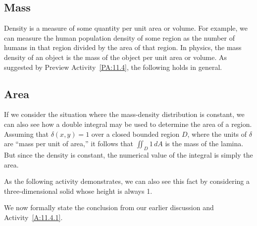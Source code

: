 

\subsection*{Mass}

Density is a measure of some quantity per unit area or volume. For example, we can measure the human population density of some region as the number of humans in that region divided by the area of that region. In physics, the mass density of an object is the mass of the object per unit area or volume.  As suggested by Preview Activity~\ref{PA:11.4}, the following holds in general.

 \vspace*{5pt}
\nin {}
\vspace*{5pt}



\subsection*{Area}

If we consider the situation where the mass-density distribution is constant, we can also see how a double integral may be used to determine the area of a region.  Assuming that $\delta(x,y) = 1$ over a closed bounded region $D$, where the units of $\delta$ are ``mass per unit of area,'' it follows that $\iint_D 1 \, dA$ is the mass of the lamina.  But since the density is constant, the numerical value of the integral is simply the area. 

As the following activity demonstrates, we can also see this fact by considering a three-dimensional solid whose height is always 1.  %



We now formally state the conclusion from our earlier discussion and Activity~\ref{A:11.4.1}.

 \vspace*{5pt}
\nin {}
\vspace*{5pt}

